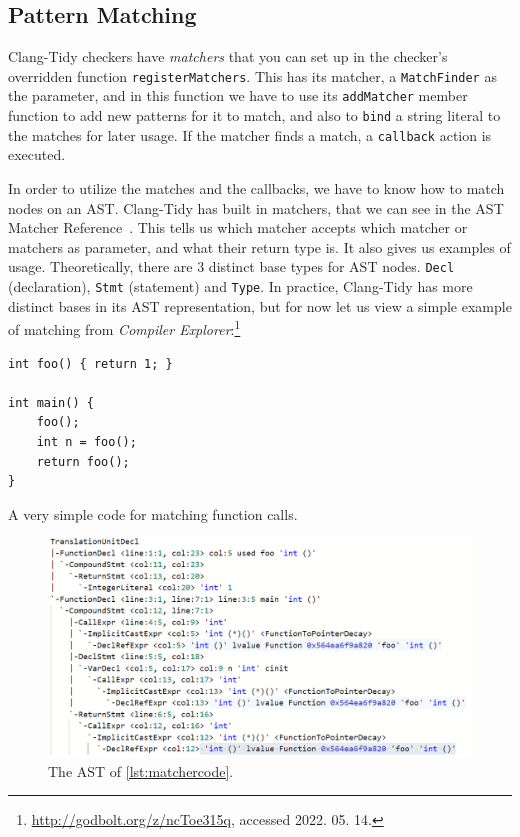 \subsection{Pattern Matching}
\label{sec:matchers}

Clang-Tidy checkers have \emph{matchers} that you can set up in the checker's overridden function \texttt{registerMatchers}.
This has its matcher, a \texttt{MatchFinder} as the parameter, and in this function we have to use its \texttt{addMatcher}
member function to add new patterns for it to match, and also to \texttt{bind} a string literal to the matches for later usage.
If the matcher finds a match, a \texttt{callback} action is executed.

In order to utilize the matches and the callbacks, we have to know how to match nodes on an AST. Clang-Tidy has built in matchers,
that we can see in the AST Matcher Reference~\cite{matcherref}. This tells us which matcher accepts which matcher or matchers as
parameter, and what their return type is. It also gives us examples of usage.
Theoretically, there are 3 distinct base types for AST nodes. \texttt{Decl} (declaration), \texttt{Stmt} (statement) and \texttt{Type}. In practice,
Clang-Tidy has more distinct bases in its AST representation, but for now let us view a simple example of matching from
\emph{Compiler Explorer}:\footnote{\url{http://godbolt.org/z/ncToe315q}, accessed 2022. 05. 14.}

\begin{listing}[H]
  \begin{verbatim}
int foo() { return 1; }

int main() {
	foo();
	int n = foo();
	return foo();
}
  \end{verbatim}
  \caption{A very simple code for matching function calls.}\label{lst:matchercode}
\end{listing}

\begin{figure}[H]
    \includegraphics[width=\linewidth]{images/ast_for_matching.png}
	\caption{The AST of \cref{lst:matchercode}.}
    \label{fig:ast3}
\end{figure}

